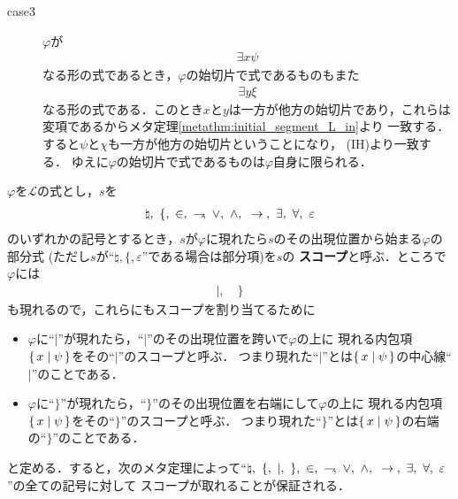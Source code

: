 \begin{metaprf}
\begin{description}
\begin{description}
					\item[case3] $\varphi$が
						\begin{align}
							\exists x \psi
						\end{align}
						なる形の式であるとき，$\varphi$の始切片で式であるものもまた
						\begin{align}
							\exists y \xi
						\end{align}
						なる形の式である．このとき$x$と$y$は一方が他方の始切片であり，これらは
						変項であるからメタ定理\ref{metathm:initial_segment_L_in}より
						一致する．すると$\psi$と$\chi$も一方が他方の始切片ということになり，
						(IH)より一致する．
						ゆえに$\varphi$の始切片で式であるものは$\varphi$自身に限られる．
						\QED
				\end{description}
		\end{description}
	\end{metaprf}
	
	$\varphi$を$\mathcal{L}$の式とし，$s$を
	\begin{align}
		\natural,\ \{,\ \in,\ \rightharpoondown\hspace{-0.25em},\ \vee,
		\ \wedge,\ \hspace{0.25em}\rightarrow\hspace{0.25em},\ \exists,\ \forall,\ \varepsilon
	\end{align}
	のいずれかの記号とするとき，$s$が$\varphi$に現れたら$s$のその出現位置から始まる$\varphi$の部分式
	(ただし$s$が``$\natural,\{,\varepsilon$''である場合は部分項)を$s$の
	{\bf スコープ}と呼ぶ．ところで$\varphi$には
	\begin{align}
		|, \quad \}
	\end{align}
	も現れるので，これらにもスコープを割り当てるために
	\begin{itemize}
		\item $\varphi$に``$|$''が現れたら，``$|$''のその出現位置を跨いで$\varphi$の上に
			現れる内包項$\{\, x \mid \psi\, \}$をその``$|$''のスコープと呼ぶ．
			つまり現れた``$|$''とは$\{\, x \mid \psi\, \}$の中心線``$|$''のことである．
			
		\item $\varphi$に``$\}$''が現れたら，``$\}$''のその出現位置を右端にして$\varphi$の上に
			現れる内包項$\{\, x \mid \psi\, \}$をその``$\}$''のスコープと呼ぶ．
			つまり現れた``$\}$''とは$\{\, x \mid \psi\, \}$の右端の``$\}$''のことである．
	\end{itemize}
	と定める．すると，次のメタ定理によって``$\natural,\ \{,\ |,\ \},\ \in,\ \negation,\ \vee,
	\ \wedge,\ \rarrow,\ \exists,\ \forall,\ \varepsilon$''の全ての記号に対して
	スコープが取れることが保証される．
	
